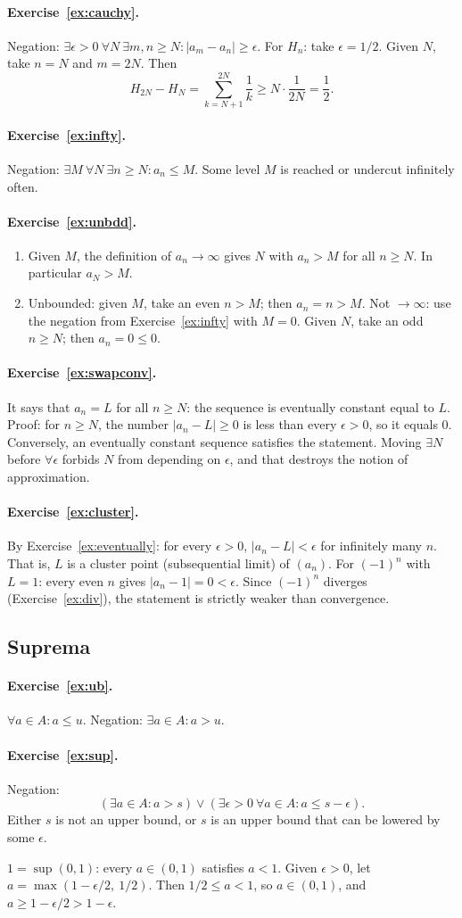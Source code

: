 \documentclass{workbook}
\theoremstyle{definition}
\newcommand{\ans}[1]{\paragraph{Exercise~\ref{#1}.}}
\begin{document}
\ans{ex:cauchy}
Negation: $\exists \epsilon > 0\ \forall N\ \exists m, n \ge N : |a_m - a_n| \ge \epsilon$. For $H_n$: take $\epsilon = 1/2$. Given $N$, take $n = N$ and $m = 2N$. Then
\[
  H_{2N} - H_N = \sum_{k=N+1}^{2N} \frac{1}{k} \ge N \cdot \frac{1}{2N} = \frac12.
\]

\ans{ex:infty}
Negation: $\exists M\ \forall N\ \exists n \ge N : a_n \le M$. Some level $M$ is reached or undercut infinitely often.

\ans{ex:unbdd}
\begin{enumerate}
  \item Given $M$, the definition of $a_n \to \infty$ gives $N$ with $a_n > M$ for all $n \ge N$. In particular $a_N > M$.
  \item Unbounded: given $M$, take an even $n > M$; then $a_n = n > M$. Not $\to \infty$: use the negation from Exercise~\ref{ex:infty} with $M = 0$. Given $N$, take an odd $n \ge N$; then $a_n = 0 \le 0$.
\end{enumerate}

\ans{ex:swapconv}
It says that $a_n = L$ for all $n \ge N$: the sequence is eventually constant equal to $L$. Proof: for $n \ge N$, the number $|a_n - L| \ge 0$ is less than every $\epsilon > 0$, so it equals $0$. Conversely, an eventually constant sequence satisfies the statement. Moving $\exists N$ before $\forall \epsilon$ forbids $N$ from depending on $\epsilon$, and that destroys the notion of approximation.

\ans{ex:cluster}
By Exercise~\ref{ex:eventually}: for every $\epsilon > 0$, $|a_n - L| < \epsilon$ for infinitely many $n$. That is, $L$ is a cluster point (subsequential limit) of $(a_n)$. For $(-1)^n$ with $L = 1$: every even $n$ gives $|a_n - 1| = 0 < \epsilon$. Since $(-1)^n$ diverges (Exercise~\ref{ex:div}), the statement is strictly weaker than convergence.

\subsection*{Suprema}

\ans{ex:ub}
$\forall a \in A : a \le u$. Negation: $\exists a \in A : a > u$.

\ans{ex:sup}
Negation:
\[
  (\exists a \in A : a > s) \lor (\exists \epsilon > 0\ \forall a \in A : a \le s - \epsilon).
\]
Either $s$ is not an upper bound, or $s$ is an upper bound that can be lowered by some $\epsilon$.

$1 = \sup (0,1)$: every $a \in (0,1)$ satisfies $a < 1$. Given $\epsilon > 0$, let $a = \max(1 - \epsilon/2,\ 1/2)$. Then $1/2 \le a < 1$, so $a \in (0,1)$, and $a \ge 1 - \epsilon/2 > 1 - \epsilon$.
\end{document}
